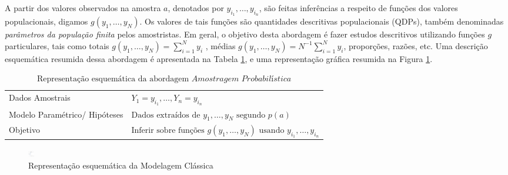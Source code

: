 \documentclass[
  12pt,
  brazilian,
]{book}
\theoremstyle{definition}
\theoremstyle{definition}
\theoremstyle{definition}
\theoremstyle{definition}
\theoremstyle{remark}
\begin{document}
A partir dos valores observados na amostra \(a\), denotados por
\(y_{i_1}, \ldots, y_{i_n}\), são feitas inferências a respeito de funções dos
valores populacionais, digamos \(g\left( y_{1}, \ldots , y_{N}\right)\). Os
valores de tais funções são quantidades descritivas populacionais (QDPs), também
denominadas \emph{parâmetros da população finita} pelos amostristas. Em geral, o
objetivo desta abordagem é fazer estudos descritivos utilizando funções \(g\)
particulares, tais como totais
\(g\left( y_{1}, \ldots , y_{N}\right) = \sum_{i=1}^{N} y_{i}\) , médias
\(g\left( y_{1}, \ldots , y_{N}\right) = N^{-1}\sum_{i=1}^{N} y_{i}\), proporções,
razões, etc. Uma descrição esquemática resumida dessa abordagem é apresentada na
Tabela \ref{tab:modelamo}, e uma representação gráfica resumida na Figura
\ref{fig:modamo}.

\begin{table}[H]

\caption{\label{tab:modelamo}$\text{Representação esquemática da abordagem }\textit{Amostragem Probabilística}$}
\centering
\begin{tabular}[t]{>{\raggedright\arraybackslash}p{4.5cm}l}
\toprule
Dados Amostrais & $Y_1=y_{i_1}, \ldots, Y_n=y_{i_n}$\\
Modelo Paramétrico/ Hipóteses & $\text{Dados extraídos de }y_1,\ldots, y_N \text{ segundo }p(a)$\\
Objetivo & $\text{Inferir sobre funções }g(y_1, \ldots , y_N)\text{ usando }y_{i_1}, \ldots, y_{i_n}$\\
\bottomrule
\end{tabular}
\end{table}

\begin{figure}
\includegraphics[width=10,81in]{Figuras/Figura2.2} \caption{Representação esquemática da Modelagem Clássica}\label{fig:modamo}
\end{figure}
\end{document}
